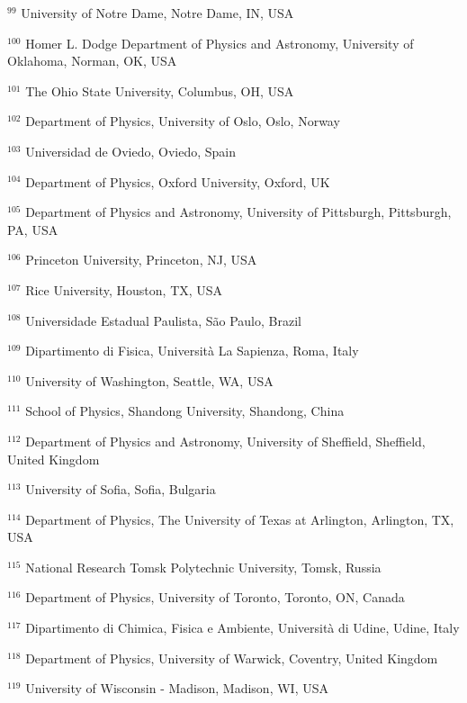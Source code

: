 \par {\footnotesize $^{99}$ University of Notre Dame, Notre Dame, IN, USA}
\par {\footnotesize $^{100}$ Homer L. Dodge Department of Physics and Astronomy, University of Oklahoma, Norman, OK, USA}
\par {\footnotesize $^{101}$ The Ohio State University, Columbus, OH, USA}
\par {\footnotesize $^{102}$ Department of Physics, University of Oslo, Oslo, Norway}
\par {\footnotesize $^{103}$ Universidad de Oviedo, Oviedo, Spain}
\par {\footnotesize $^{104}$ Department of Physics, Oxford University, Oxford, UK}
\par {\footnotesize $^{105}$ Department of Physics and Astronomy, University of Pittsburgh, Pittsburgh, PA, USA}
\par {\footnotesize $^{106}$ Princeton University, Princeton, NJ, USA}
\par {\footnotesize $^{107}$ Rice University, Houston, TX, USA}
\par {\footnotesize $^{108}$ Universidade Estadual Paulista, São Paulo, Brazil}
\par {\footnotesize $^{109}$ Dipartimento di Fisica, Università La Sapienza, Roma, Italy}
\par {\footnotesize $^{110}$ University of Washington, Seattle, WA, USA}
\par {\footnotesize $^{111}$ School of Physics, Shandong University, Shandong, China}
\par {\footnotesize $^{112}$ Department of Physics and Astronomy, University of Sheffield, Sheffield, United Kingdom}
\par {\footnotesize $^{113}$ University of Sofia, Sofia, Bulgaria}
\par {\footnotesize $^{114}$ Department of Physics, The University of Texas at Arlington, Arlington, TX, USA}
\par {\footnotesize $^{115}$ National Research Tomsk Polytechnic University, Tomsk, Russia}
\par {\footnotesize $^{116}$ Department of Physics, University of Toronto, Toronto, ON, Canada}
\par {\footnotesize $^{117}$ Dipartimento di Chimica, Fisica e Ambiente, Università di Udine, Udine, Italy}
\par {\footnotesize $^{118}$ Department of Physics, University of Warwick, Coventry, United Kingdom}
\par {\footnotesize $^{119}$ University of Wisconsin - Madison, Madison, WI, USA}
